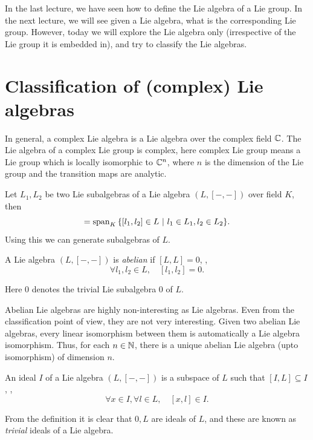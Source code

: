 
In the last lecture, we have seen how to define the Lie algebra of a Lie group. In the next lecture, we will see given a Lie algebra, what is the corresponding Lie group. However, today we will explore the Lie algebra only (irrespective of the Lie group it is embedded in), and try to classify the Lie algebras.

\section{Classification of (complex) Lie algebras}

In general, a complex Lie algebra is a Lie algebra over the complex field \(\mathbb C\). The Lie algebra of a complex Lie group is complex, here complex Lie group means a Lie group which is locally isomorphic to \(\mathbb C^n\), where \(n\) is the dimension of the Lie group and the transition maps are analytic.

Let \(L_1, L_2\) be two Lie subalgebras of a Lie algebra \((L, [-, -])\) over field \(K\), then
\begin{equation*}
    [L_1, L_2] = \Span_K\qty{[l_1, l_2] \in L \mid l_1 \in L_1, l_2 \in L_2}.
\end{equation*}
Using this we can generate subalgebras of \(L\).
\begin{definition}
    A Lie algebra \((L, [-, -])\) is \emph{abelian} if \([L, L] = 0\), \ie,
    \begin{equation*}
        \forall l_1, l_2 \in L, \quad [l_1, l_2] = 0.
    \end{equation*}
\end{definition}
Here \(0\) denotes the trivial Lie subalgebra \(\qty{0}\) of \(L\).

Abelian Lie algebras are highly non-interesting as Lie algebras. Even from the classification point of view, they are not very interesting. Given two abelian Lie algebras, every linear isomorphism between them is automatically a Lie algebra isomorphism. Thus, for each \(n \in \mathbb N\), there is a unique abelian Lie algebra (upto isomorphism) of dimension \(n\).

\begin{definition}
    An ideal \(I\) of a Lie algebra \((L, [-, -])\) is a subspace of \(L\) such that \([I, L] \subseteq I\), \ie,
    \begin{equation*}
        \forall x \in I, \forall l \in L, \quad [x, l] \in I.
    \end{equation*}
\end{definition}
From the definition it is clear that \(\qty{0}, L\) are ideals of \(L\), and these are known as \emph{trivial} ideals of a Lie algebra.

